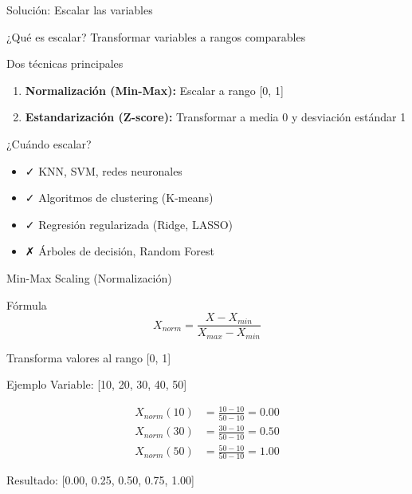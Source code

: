 \documentclass[aspectratio=169]{beamer}
\begin{document}
\begin{frame}{Solución: Escalar las variables}
\begin{block}{¿Qué es escalar?}
Transformar variables a rangos comparables
\end{block}

\begin{block}{Dos técnicas principales}
\begin{enumerate}
    \item \textbf{Normalización (Min-Max):} Escalar a rango [0, 1]
    \item \textbf{Estandarización (Z-score):} Transformar a media 0 y desviación estándar 1
\end{enumerate}
\end{block}

\pause

\begin{alertblock}{¿Cuándo escalar?}
\begin{itemize}
    \item ✓ KNN, SVM, redes neuronales
    \item ✓ Algoritmos de clustering (K-means)
    \item ✓ Regresión regularizada (Ridge, LASSO)
    \item ✗ Árboles de decisión, Random Forest
\end{itemize}
\end{alertblock}
\end{frame}

\begin{frame}{Min-Max Scaling (Normalización)}
\begin{block}{Fórmula}
$$X_{norm} = \frac{X - X_{min}}{X_{max} - X_{min}}$$

Transforma valores al rango [0, 1]
\end{block}

\begin{exampleblock}{Ejemplo}
Variable: [10, 20, 30, 40, 50]

\begin{align*}
X_{norm}(10) &= \frac{10 - 10}{50 - 10} = 0.00 \\
X_{norm}(30) &= \frac{30 - 10}{50 - 10} = 0.50 \\
X_{norm}(50) &= \frac{50 - 10}{50 - 10} = 1.00
\end{align*}

Resultado: [0.00, 0.25, 0.50, 0.75, 1.00]
\end{exampleblock}
\end{frame}
\end{document}
